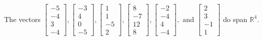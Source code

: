 \begin{exercise}
\begin{exerciseStatement}
  \end{exerciseStatement}
  \begin{exerciseAnswer}
   The vectors \(\left[\begin{array}{r}
-5 \\
-4 \\
3 \\
-4
\end{array}\right] , \left[\begin{array}{r}
-3 \\
4 \\
0 \\
-5
\end{array}\right] , \left[\begin{array}{r}
1 \\
1 \\
-5 \\
2
\end{array}\right] , \left[\begin{array}{r}
8 \\
-7 \\
12 \\
8
\end{array}\right] , \left[\begin{array}{r}
-2 \\
-4 \\
4 \\
-4
\end{array}\right] , \text{ and } \left[\begin{array}{r}
2 \\
3 \\
-1 \\
1
\end{array}\right]\) 
  	 do  
	span \(\mathbb{R}^4\).
  


  \end{exerciseAnswer}
\end{exercise}